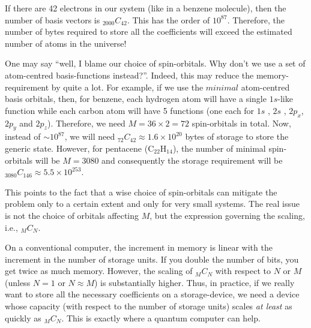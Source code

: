 \documentclass[12pt,oneside]{book}
\begin{document}
If there are 42 electrons in our system (like in a benzene molecule), then the number of basis vectors is $_{2000}C_{42}$. This has the order of $10^{87}$. Therefore, the number of bytes required to store all the coefficients will exceed the estimated number of atoms in the universe!

One may say ``well, I blame our choice of spin-orbitals. Why don't we use a set of atom-centred basis-functions instead?''. Indeed, this may reduce the memory-requirement by quite a lot. For example, if we use the $\textit{minimal}$ atom-centred basis orbitals, then, for benzene, each hydrogen atom will have a single $1s$-like function while each carbon atom will have 5 functions (one each for $1s$ , $2s$ , $2p_x$, $2p_y$ and $2p_z$). Therefore, we need $M = 36 \times 2 =72$ spin-orbitals in total. Now, instead of $\sim 10^{87}$, we will need $_{72}C_{42} \approx 1.6 \times 10^{20}$ bytes of storage to store the generic state. However, for pentacene ($\mathrm{C}_{22}\mathrm{H}_{14}$), the number of minimal spin-orbitals will be $M = 3080$ and consequently the storage requirement will be $_{3080}C_{146} \approx 5.5 \times 10^{253}$.

This points to the fact that a wise choice of spin-orbitals can mitigate the problem only to a certain extent and only for very small systems. The real issue is not the choice of orbitals affecting $M$, but the expression governing the scaling, i.e., $_MC_N$.

On a conventional computer, the increment in memory is linear with the increment in the number of storage units. If you double the number of bits, you get twice as much memory. However, the scaling of $_{M}C_N$  with respect to $N$ or $M$ (unless $N=1$ or $N\approx M$) is substantially higher. Thus, in practice, if we really want to store all the necessary coefficients on a storage-device, we need a device whose capacity (with respect to the number of storage units) scales \textit{at least} as quickly as $_{M}C_N$. This is exactly where a quantum computer can help.


\end{document}
